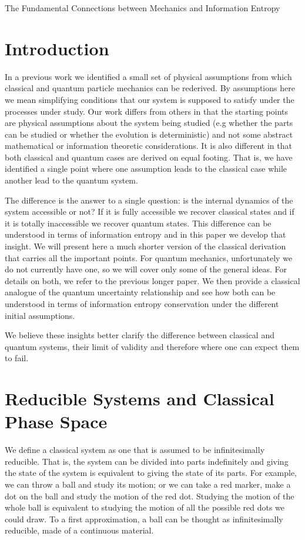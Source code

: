 \documentclass{ws-ijqi}
\begin{document}
{The Fundamental Connections between Mechanics and Information Entropy}

\section{Introduction}
In a previous work\cite{Carc1} we identified a small set of physical assumptions from which classical and quantum particle mechanics can be rederived. By assumptions here we mean simplifying conditions that our system is supposed to satisfy under the processes under study. Our work differs from others in that the starting points are physical assumptions about the system being studied (e.g whether the parts can be studied or whether the evolution is deterministic) and not some abstract mathematical or information theoretic considerations. It is also different in that both classical and quantum cases are derived on equal footing. That is, we have identified a single point where one assumption leads to the classical case while another lead to the quantum system.

The difference is the answer to a single question: is the internal dynamics of the system accessible or not? If it is fully accessible we recover classical states and if it is totally inaccessible we recover quantum states. This difference can be understood in terms of information entropy and in this paper we develop that insight. We will present here a much shorter version of the classical derivation that carries all the important points. For quantum mechanics, unfortunately we do not currently have one, so we will cover only some of the general ideas. For details on both, we refer to the previous longer paper. We then provide a classical analogue of the quantum uncertainty relationship and see how both can be understood in terms of information entropy conservation under the different initial assumptions.

We believe these insights better clarify the difference between classical and quantum systems, their limit of validity and therefore where one can expect them to fail.

\section{Reducible Systems and Classical Phase Space}
We define a classical system as one that is assumed to be infinitesimally reducible. That is, the system can be divided into parts indefinitely and giving the state of the system is equivalent to giving the state of its parts. For example, we can throw a ball and study its motion; or we can take a red marker, make a dot on the ball and study the motion of the red dot. Studying the motion of the whole ball is equivalent to studying the motion of all the possible red dots we could draw. To a first approximation, a ball can be thought as infinitesimally reducible, made of a continuous material.
\end{document}
